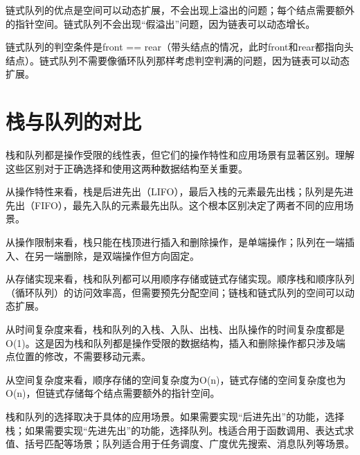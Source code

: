 \documentclass[12pt, a4paper]{article}
\begin{document}
链式队列的优点是空间可以动态扩展，不会出现上溢出的问题；每个结点需要额外的指针空间。链式队列不会出现“假溢出”问题，因为链表可以动态增长。

链式队列的判空条件是front == rear（带头结点的情况，此时front和rear都指向头结点）。链式队列不需要像循环队列那样考虑判空判满的问题，因为链表可以动态扩展。

\section{栈与队列的对比}

栈和队列都是操作受限的线性表，但它们的操作特性和应用场景有显著区别。理解这些区别对于正确选择和使用这两种数据结构至关重要。

从操作特性来看，栈是后进先出（LIFO），最后入栈的元素最先出栈；队列是先进先出（FIFO），最先入队的元素最先出队。这个根本区别决定了两者不同的应用场景。

从操作限制来看，栈只能在栈顶进行插入和删除操作，是单端操作；队列在一端插入、在另一端删除，是双端操作但方向固定。

从存储实现来看，栈和队列都可以用顺序存储或链式存储实现。顺序栈和顺序队列（循环队列）的访问效率高，但需要预先分配空间；链栈和链式队列的空间可以动态扩展。

从时间复杂度来看，栈和队列的入栈、入队、出栈、出队操作的时间复杂度都是O(1)。这是因为栈和队列都是操作受限的数据结构，插入和删除操作都只涉及端点位置的修改，不需要移动元素。

从空间复杂度来看，顺序存储的空间复杂度为O(n)，链式存储的空间复杂度也为O(n)，但链式存储每个结点需要额外的指针空间。

栈和队列的选择取决于具体的应用场景。如果需要实现“后进先出”的功能，选择栈；如果需要实现“先进先出”的功能，选择队列。栈适合用于函数调用、表达式求值、括号匹配等场景；队列适合用于任务调度、广度优先搜索、消息队列等场景。
\end{document}
